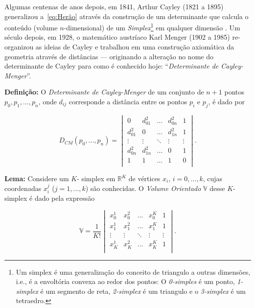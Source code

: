 Algumas centenas de anos depois, em 1841, Arthur Cayley (1821 a 1895) generalizou a~\ref{eq:Herão} através da construção de um determinante que calcula o conteúdo (volume $n$-dimensional) de um \textit{Simplex}\footnote{Um simplex é uma generalização do conceito de triangulo a outras dimensões, i.e., é a envoltória convexa ao redor dos pontos: O \textit{0-simples} é um ponto, \textit{1-simplex} é um segmento de reta, \textit{2-simplex} é um triangulo e o \textit{3-simplex} é um tetraedro.} em qualquer dimensão \cite{cayley1841HaronGD, douglasGD}. Um século depois, em 1928, o matemático austríaco Karl Menger (1902 a 1985) re-organizou as ideias de Cayley e trabalhou em uma construção axiomática da geometria através de distâncias \cite{mengerDeterminante} --- originando a alteração no nome do determinante de Cayley para como é conhecido hoje: ``\textit{Determinante de Cayley-Menger}''.  

\begin{center}
	\begin{minipage}{0.9 \linewidth}
		\textbf{Definição:} O \textit{Determinante de Cayley-Menger} de um conjunto de $n+1$ pontos $p_0,p_1,\dots,p_n$, onde $d_{ij}$ corresponde a distância entre os pontos $p_i$ e $p_j$, é dado por
	\end{minipage}
\end{center} 

\begin{equation}\tag{Determinante de Cayley-Menger}
D_{CM}(p_0,\dots,p_n) = 
\begin{vmatrix}
0 & d^2_{01} & \ldots & d^2_{0n} & 1\\ 
d^2_{01} & 0 & \ldots & d^2_{1n} & 1\\ 
\vdots & \vdots & \ddots & \vdots & \vdots\\ 
d^2_{0n} & d^2_{1n} & \ldots & 0 & 1\\ 
1 & 1 & \ldots & 1 & 0\\ 
\end{vmatrix}.
\label{determinanteCayleyMenger}
\end{equation}

\begin{center}
	\begin{minipage}{0.93 \linewidth}
		\textbf{Lema:} Considere um $K$- simplex em $\mathbb{R}^K$ de vértices $x_i$, $i = 0,\dots,k$, cujas coordenadas $x_i^j$ ($j = 1,\dots,k$) são conhecidas. O \textit{Volume Orientado} $\mathbb{V}$ desse $K$-simplex é dado pela expressão
	\end{minipage}
	\begin{equation}
		\mathbb{V} = \frac{1}{K!} 
		\begin{vmatrix}
		x_0^1 & x^2_{0} & \ldots & x^K_{0} & 1\\ 
		x^1_{1} & x^2_1 & \ldots & x^K_{1} & 1\\ 
		\vdots & \vdots & \ddots & \vdots & \vdots\\ 
		x^1_{K} & x^2_{K} & \ldots & x_K^K & 1\\ 
		\end{vmatrix}.
		\label{eq:volumeOrientado}
	\end{equation}
\end{center} 

